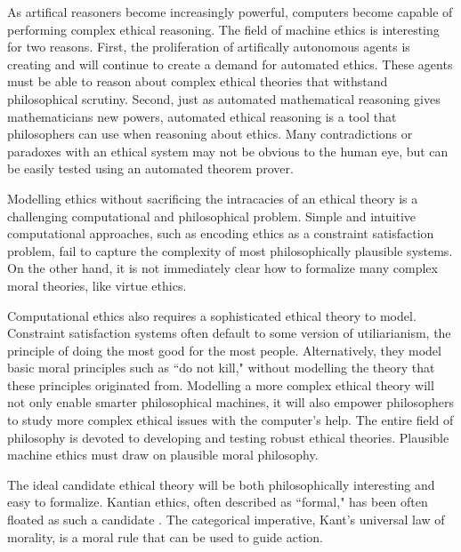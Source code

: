 %
\begin{isabellebody}%
%
%
\isadelimtheory
%
\endisadelimtheory
%
\isatagtheory
%
\endisatagtheory
{\isafoldtheory}%
%
\isadelimtheory
%
\endisadelimtheory
%
\isadelimdocument
%
\endisadelimdocument
%
\isatagdocument
%
\isamarkuptrue%
%
\endisatagdocument
{\isafolddocument}%
%
\isadelimdocument
%
\endisadelimdocument
%
\begin{isamarkuptext}%
As artifical reasoners become increasingly powerful, computers become capable of
performing complex ethical reasoning. The field of machine ethics \cite{mesurvey} is interesting for two reasons.
First, the proliferation of artifically autonomous agents is creating and will continue to create a demand for 
automated ethics. These agents must be able to reason about complex ethical theories 
that withstand philosophical scrutiny. Second, just as automated mathematical reasoning gives mathematicians
new powers, automated ethical reasoning is a tool that philosophers can use 
when reasoning about ethics. Many contradictions or paradoxes with an ethical system may not be 
 obvious to the human eye, but can be easily tested using an automated theorem prover.

Modelling ethics without sacrificing the intracacies of an ethical theory is a 
challenging computational and philosophical problem. Simple and intuitive computational approaches, 
such as encoding ethics as a constraint satisfaction problem, fail to capture
the complexity of most philosophically plausible systems. On the other hand, it is not immediately clear
how to formalize many complex moral theories, like virtue ethics.

Computational ethics also requires a sophisticated 
ethical theory to model. Constraint satisfaction systems often default to some version of utiliarianism, 
the principle of doing the most good for the most people. Alternatively, they model basic moral 
principles such as ``do not kill," without modelling the theory that these principles originated from.
Modelling a more complex ethical theory will not only enable smarter philosophical machines, it will
also empower philosophers to study more complex ethical issues with the computer's help. The entire
field of philosophy is devoted to developing and testing robust ethical theories. Plausible machine
ethics must draw on plausible moral philosophy.

The ideal candidate ethical theory will be both philosophically interesting and easy to 
formalize. Kantian ethics, often described as ``formal," has been often floated as such a candidate \cite{powers, BL, lin}. 
The categorical imperative, Kant's universal law of morality, is a moral rule that can be used to 
guide action. 


\end{isamarkuptext}
\end{isabellebody}

